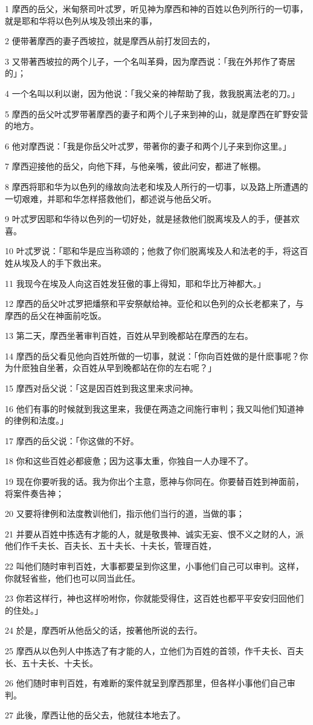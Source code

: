 \par 1 摩西的岳父，米甸祭司叶忒罗，听见神为摩西和神的百姓以色列所行的一切事，就是耶和华将以色列从埃及领出来的事，
\par 2 便带著摩西的妻子西坡拉，就是摩西从前打发回去的，
\par 3 又带著西坡拉的两个儿子，一个名叫革舜，因为摩西说：「我在外邦作了寄居的」；
\par 4 一个名叫以利以谢，因为他说：「我父亲的神帮助了我，救我脱离法老的刀。」
\par 5 摩西的岳父叶忒罗带著摩西的妻子和两个儿子来到神的山，就是摩西在旷野安营的地方。
\par 6 他对摩西说：「我是你岳父叶忒罗，带著你的妻子和两个儿子来到你这里。」
\par 7 摩西迎接他的岳父，向他下拜，与他亲嘴，彼此问安，都进了帐棚。
\par 8 摩西将耶和华为以色列的缘故向法老和埃及人所行的一切事，以及路上所遭遇的一切艰难，并耶和华怎样搭救他们，都述说与他岳父听。
\par 9 叶忒罗因耶和华待以色列的一切好处，就是拯救他们脱离埃及人的手，便甚欢喜。
\par 10 叶忒罗说：「耶和华是应当称颂的；他救了你们脱离埃及人和法老的手，将这百姓从埃及人的手下救出来。
\par 11 我现今在埃及人向这百姓发狂傲的事上得知，耶和华比万神都大。」
\par 12 摩西的岳父叶忒罗把燔祭和平安祭献给神。亚伦和以色列的众长老都来了，与摩西的岳父在神面前吃饭。
\par 13 第二天，摩西坐著审判百姓，百姓从早到晚都站在摩西的左右。
\par 14 摩西的岳父看见他向百姓所做的一切事，就说：「你向百姓做的是什麽事呢？你为什麽独自坐著，众百姓从早到晚都站在你的左右呢？」
\par 15 摩西对岳父说：「这是因百姓到我这里来求问神。
\par 16 他们有事的时候就到我这里来，我便在两造之间施行审判；我又叫他们知道神的律例和法度。」
\par 17 摩西的岳父说：「你这做的不好。
\par 18 你和这些百姓必都疲惫；因为这事太重，你独自一人办理不了。
\par 19 现在你要听我的话。我为你出个主意，愿神与你同在。你要替百姓到神面前，将案件奏告神；
\par 20 又要将律例和法度教训他们，指示他们当行的道，当做的事；
\par 21 并要从百姓中拣选有才能的人，就是敬畏神、诚实无妄、恨不义之财的人，派他们作千夫长、百夫长、五十夫长、十夫长，管理百姓，
\par 22 叫他们随时审判百姓，大事都要呈到你这里，小事他们自己可以审判。这样，你就轻省些，他们也可以同当此任。
\par 23 你若这样行，神也这样吩咐你，你就能受得住，这百姓也都平平安安归回他们的住处。」
\par 24 於是，摩西听从他岳父的话，按著他所说的去行。
\par 25 摩西从以色列人中拣选了有才能的人，立他们为百姓的首领，作千夫长、百夫长、五十夫长、十夫长。
\par 26 他们随时审判百姓，有难断的案件就呈到摩西那里，但各样小事他们自己审判。
\par 27 此後，摩西让他的岳父去，他就往本地去了。

